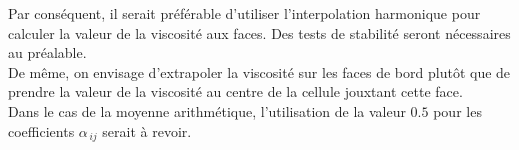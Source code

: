 Par conséquent, il serait préférable d'utiliser l'interpolation harmonique pour
calculer la valeur de la viscosité aux faces. Des tests de stabilité seront
nécessaires au préalable.
\\
De même, on envisage d'extrapoler la viscosité sur les faces de bord plutôt que
de prendre la valeur de la viscosité au centre de la cellule jouxtant cette face.\\
Dans le cas de la moyenne arithmétique, l'utilisation de la valeur $0.5$ pour
les coefficients $\alpha_{\,ij}$ serait à revoir.
